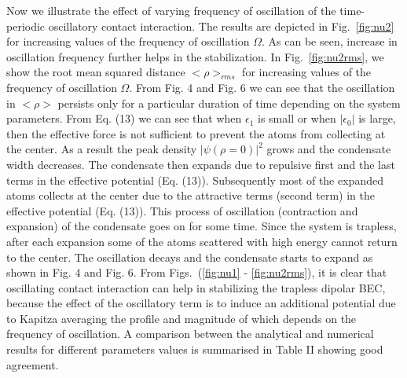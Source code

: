 \documentclass[amsmath,amssymb,article,twocolumn,superscriptaddress,showpacs,10pt]{revtex4-1}
\begin{document}
Now we illustrate the effect of varying frequency of oscillation of the time-periodic oscillatory contact interaction. The results are depicted in Fig.~\ref{fig:nu2} for increasing values of the frequency of oscillation $\Omega$. As can be seen, increase in oscillation frequency further helps in the stabilization.
%
In Fig.~\ref{fig:nu2rms}, we show the root mean squared distance $<\rho>_{rms}$ for increasing values of the frequency of oscillation $\Omega$. From Fig. 4 and Fig. 6 we can see that the oscillation in $<\rho>$ persists only for a particular duration of time depending on the system parameters. From Eq. (13) we can see that when $\epsilon_1$ is small or when $|\epsilon_0|$ is large, then the effective force is not sufficient to prevent the atoms from collecting at the center. As a result the peak density $|\psi(\rho = 0)|^2$ grows and the condensate width decreases. The condensate then expands due to repulsive first and the last terms in the effective potential (Eq. (13)). Subsequently most of the expanded atoms collects at the center due to the attractive terms (second term) in the effective potential (Eq. (13)). This process of oscillation (contraction and expansion) of the condensate goes on for some time. Since the system is trapless, after each expansion some of the atoms scattered with high energy cannot return to the center. The oscillation decays and the condensate starts to expand as shown in Fig. 4 and Fig. 6. From Figs.~(\ref{fig:nu1} - \ref{fig:nu2rms}), it is clear that oscillating contact interaction can help in stabilizing the trapless dipolar BEC, because the effect of the oscillatory term is to induce an additional potential due to Kapitza averaging \cite{Sabari:2010,Adhikari:2004,Saito:2003} the profile and magnitude of which depends on the frequency of oscillation. A comparison between the analytical and numerical results for different parameters values is summarised in Table II showing good agreement.\\
%
\end{document}
